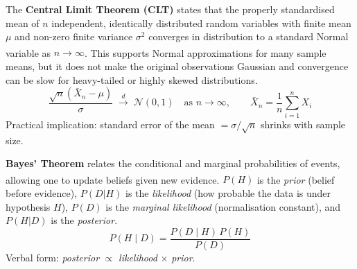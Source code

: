 \begin{tcbitemize}[ skin=sectionraster ]
        \tcbitem[title={Central Limit Theorem}, raster multicolumn=6]
        The \textbf{Central Limit Theorem (CLT)} states that the properly standardised mean of $n$ independent, identically distributed random variables with finite mean $\mu$ and non-zero finite variance $\sigma^2$ converges in distribution to a standard Normal variable as $n \to \infty$\textsuperscript{\cite{downeyThinkStatsExploratory2015}}. This supports Normal approximations for many sample means, but it does not make the original observations Gaussian and convergence can be slow for heavy-tailed or highly skewed distributions.
        \tcblower
        \begin{equation}
            \frac{\sqrt{n}(\bar{X}_n-\mu)}{\sigma}
            \;\xrightarrow{d}\; \mathcal{N}(0,1)
            \quad \text{as } n \to \infty,
            \qquad
            \bar{X}_n = \frac{1}{n}\sum_{i=1}^n X_i
        \end{equation}
        Practical implication: standard error of the mean $= \sigma / \sqrt{n}$ shrinks with sample size.

        \tcbitem[title={Bayes’ Theorem}, raster multicolumn=6]
        \textbf{Bayes’ Theorem} relates the conditional and marginal probabilities of events, allowing one to update beliefs given new evidence\textsuperscript{\cite{downeyThinkBayes2016}}. $P(H)$ is the \emph{prior} (belief before evidence), $P(D|H)$ is the \emph{likelihood} (how probable the data is under hypothesis $H$), $P(D)$ is the \emph{marginal likelihood} (normalisation constant), and $P(H|D)$ is the \emph{posterior}.
        \tcblower
        \begin{equation}
            P(H \mid D) = \frac{P(D \mid H)\, P(H)}{P(D)}
        \end{equation}
        Verbal form: \emph{posterior} $\propto$ \emph{likelihood} $\times$ \emph{prior}.

    \end{tcbitemize}

